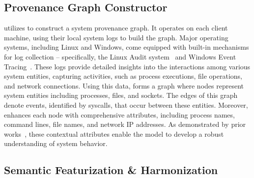 




\subsection{Provenance Graph Constructor}
\label{provconstruct}


\Sys utilizes \logs to construct a system provenance graph. It operates on each client machine, using their local system logs to build the graph. Major operating systems, including Linux and Windows, come equipped with built-in mechanisms for log collection -- specifically, the Linux Audit system~\cite{linuxaudit} and Windows Event Tracing~\cite{windowsaudit}. These logs provide detailed insights into the interactions among various system entities, capturing activities, such as process executions, file operations, and network connections. Using this data, \Sys forms a graph where nodes represent system entities including processes, files, and sockets. The edges of this graph denote events, identified by syscalls, that occur between these entities. Moreover, \Sys enhances each node with comprehensive attributes, including process names, command lines, file names, and network IP addresses. As demonstrated by prior works~\cite{flash2024,cheng2023kairos}, these contextual attributes enable the model to develop a robust understanding of system behavior.


\subsection{Semantic Featurization \& Harmonization}
\label{semanfeat}

